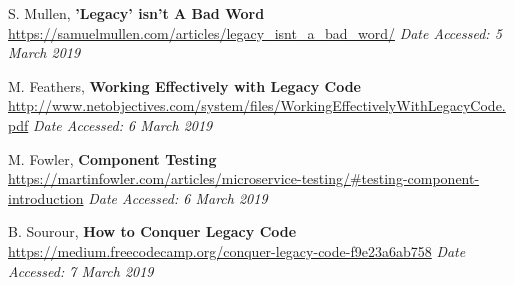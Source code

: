 \documentclass[11pt]{article}
\begin{document}
{\footnotesize
\begin{thebibliography}{9}
    S. Mullen, \textbf{'Legacy' isn't A Bad Word}
    \url{https://samuelmullen.com/articles/legacy_isnt_a_bad_word/}
    \textit{Date Accessed: 5 March 2019}
    
    M. Feathers, \textbf{Working Effectively with Legacy Code}
    \url{http://www.netobjectives.com/system/files/WorkingEffectivelyWithLegacyCode.pdf}
    \textit{Date Accessed: 6 March 2019}

    M. Fowler, \textbf{Component Testing}
    \url{https://martinfowler.com/articles/microservice-testing/#testing-component-introduction}
    \textit{Date Accessed: 6 March 2019}

    B. Sourour, \textbf{How to Conquer Legacy Code}
    \url{https://medium.freecodecamp.org/conquer-legacy-code-f9e23a6ab758}
    \textit{Date Accessed: 7 March 2019}
\end{thebibliography}
}
\end{document}
